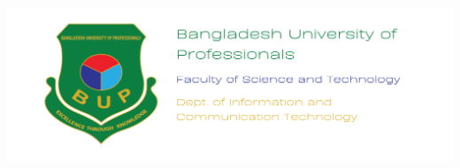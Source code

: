 \begin{titlepage}

\center %




\includegraphics[width=17cm]{title/Bangladesh University of Professionals.png}\\[1cm] 
\ifdefined\school
\Large \textsc{\school} \\[1.5cm] %
\ifdefined\department
\large \department\\[1.5cm] %
\fi

\makeatletter
\textsc{{ \huge \bfseries \thesistitle}}\\[1.5cm] %
 


\ifdefined\authorid
\authorname\\ %
\authorid\\[2cm] %
\else
\textsc{\authorname}\\[2cm] %
\fi



\end{titlepage}
